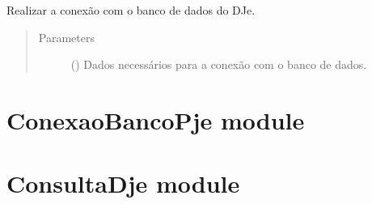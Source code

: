 \documentclass[letterpaper,10pt,english]{sphinxmanual}
\begin{document}
\begin{fulllineitems}
\label{\detokenize{ConexaoBancoDje:ConexaoBancoDje.conexaomBanco}}
Realizar a conexão com o banco de dados do DJe.
\begin{quote}\begin{description}
\item[{Parameters}] \leavevmode
{} () \textendash{} Dados necessários para a conexão com o banco de dados.

\end{description}\end{quote}

\end{fulllineitems}



\section{ConexaoBancoPje module}
\label{\detokenize{ConexaoBancoPje:module-ConexaoBancoPje}}\label{\detokenize{ConexaoBancoPje:conexaobancopje-module}}\label{\detokenize{ConexaoBancoPje::doc}}

\begin{fulllineitems}
\label{\detokenize{ConexaoBancoPje:ConexaoBancoPje.conexaoComBanco}}
\end{fulllineitems}



\section{ConsultaDje module}
\label{\detokenize{ConsultaDje:module-ConsultaDje}}\label{\detokenize{ConsultaDje:consultadje-module}}\label{\detokenize{ConsultaDje::doc}}
\end{document}

